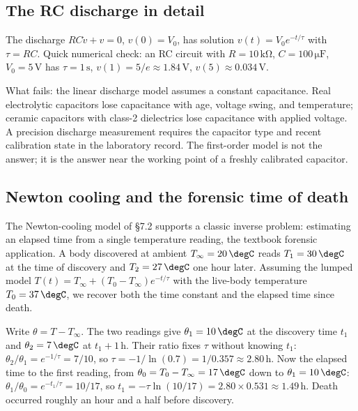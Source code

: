 \subsection{The RC discharge in detail}

The discharge $RC \dot{v} + v = 0$, $v(0) = V_{0}$, has solution
$v(t) = V_{0} e^{-t/\tau}$ with $\tau = RC$. Quick numerical
check: an RC circuit with $R = 10\,\si{\kilo\ohm}$, $C =
100\,\si{\micro\farad}$, $V_{0} = 5\,\si{\volt}$ has $\tau = 1\,\si
{\second}$, $v(1) = 5/e \approx 1.84\,\si{\volt}$, $v(5)
\approx 0.034\,\si{\volt}$.

What fails: the linear discharge model assumes a constant capacitance.
Real electrolytic capacitors lose capacitance with age, voltage
swing, and temperature; ceramic capacitors with class-2 dielectrics
lose capacitance with applied voltage. A precision discharge
measurement requires the capacitor type and recent calibration
state in the laboratory record. The first-order model is not the
answer; it is the answer near the working point of a freshly
calibrated capacitor.

\subsection{Newton cooling and the forensic time of death}

The Newton-cooling model of \S7.2 supports a classic inverse
problem: estimating an elapsed time from a single temperature
reading, the textbook forensic application. A body discovered at
ambient $T_{\infty} = 20\,\degC$ reads $T_{1} = 30\,\degC$ at the
time of discovery and $T_{2} = 27\,\degC$ one hour later. Assuming
the lumped model $T(t) = T_{\infty} + (T_{0} - T_{\infty})
e^{-t/\tau}$ with the live-body temperature $T_{0} = 37\,\degC$, we
recover both the time constant and the elapsed time since death.

Write $\theta = T - T_{\infty}$. The two readings give $\theta_{1} =
10\,\degC$ at the discovery time $t_{1}$ and $\theta_{2} = 7\,\degC$
at $t_{1} + 1\,\si{\hour}$. Their ratio fixes $\tau$ without knowing
$t_{1}$: $\theta_{2}/\theta_{1} = e^{-1/\tau} = 7/10$, so
$\tau = -1/\ln(0.7) = 1/0.357 \approx 2.80\,\si{\hour}$. Now the
elapsed time to the first reading, from $\theta_{0} = T_{0} -
T_{\infty} = 17\,\degC$ down to $\theta_{1} = 10\,\degC$:
$\theta_{1}/\theta_{0} = e^{-t_{1}/\tau} = 10/17$, so $t_{1} =
-\tau \ln(10/17) = 2.80 \times 0.531 \approx 1.49\,\si{\hour}$. Death
occurred roughly an hour and a half before discovery.

